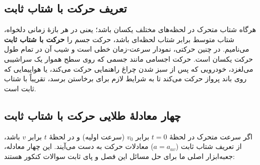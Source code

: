 \documentclass[12pt, a4paper]{article}
\begin{document}
\subsection{تعریف حرکت با شتاب ثابت}

هرگاه شتاب متحرک در لحظه‌های مختلف یکسان باشد؛ یعنی در هر بازهٔ زمانی دلخواه، شتاب متوسط برابر شتاب لحظه‌ای باشد، حرکت جسم را \textbf{حرکت با شتاب ثابت} می‌نامیم. در چنین حرکتی، نمودار سرعت-زمان خطی است و شیب آن در تمام طول حرکت یکسان است. حرکت اجسامی مانند جسمی که روی سطح هموار یک سراشیبی می‌لغزد، خودرویی که پس از سبز شدن چراغ راهنمایی حرکت می‌کند، یا هواپیمایی که روی باند پرواز حرکت می‌کند تا به شرایط لازم برای برخاستن برسد، تقریباً با شتاب ثابت است.

\begin{center}
\end{center}

\subsection{چهار معادلهٔ طلایی حرکت با شتاب ثابت}

اگر سرعت متحرک در لحظهٔ $t=0$ برابر $v_0$ (سرعت اولیه) و در لحظهٔ $t$ برابر $v$ باشد، از تعریف شتاب ثابت ($a = a_{av}$) معادلات حرکت به دست می‌آیند. این چهار معادله، جعبه‌ابزار اصلی ما برای حل مسائل این فصل و پای ثابت سوالات کنکور هستند:
\end{document}
